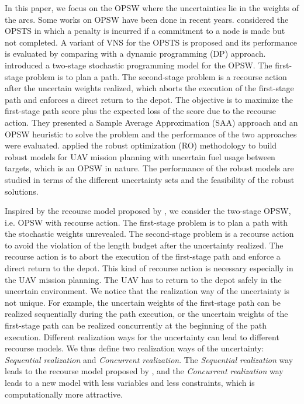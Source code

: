 \documentclass[preprint,review,10pt,round,authoryear]{elsarticle}\usepackage[]{graphicx}\usepackage[]{color}
\theoremstyle{plain}
\theoremstyle{definition}
\theoremstyle{remark}
\begin{document}
In this paper, we focus on the OPSW where the uncertainties lie in the weights of the arcs. Some works on OPSW have been done in recent years. \cite{campbell2011orienteering} considered the OPSTS in which a penalty is incurred if a commitment to a node is made but not completed. A variant of VNS for the OPSTS is proposed and its performance is evaluated by comparing with a dynamic programming (DP) approach. \cite{evers2014two} introduced a two-stage stochastic programming model for the OPSW. The first-stage problem is to plan a path. The second-stage problem is a recourse action after the uncertain weights realized, which aborts the execution of the first-stage path and enforces a direct return to the depot. The objective is to maximize the first-stage path score plus the expected loss of the score due to the recourse action. They presented a Sample Average Approximation (SAA) approach and an OPSW heuristic to solve the problem and the performance of the two approaches were evaluated. \cite{evers2014robust} applied the robust optimization (RO) methodology to build robust models for UAV mission planning with uncertain fuel usage between targets, which is an OPSW in nature. The performance of the robust models are studied in terms of the different uncertainty sets and the feasibility of the robust solutions. 


Inspired by the recourse model proposed by \cite{evers2014two}, we consider the two-stage OPSW, i.e. OPSW with recourse action. The first-stage problem is to plan a path with the stochastic weights unrevealed. The second-stage problem is a recourse action to avoid the violation of the length budget after the uncertainty realized. The recourse action is to abort the execution of the first-stage path and enforce a direct return to the depot. This kind of recourse action is necessary especially in the UAV mission planning. The UAV has to return to the depot safely in the uncertain environment. We notice that the realization way of the uncertainty is not unique. For example, the uncertain weights of the first-stage path can be realized sequentially during the path execution, or the uncertain weights of the first-stage path can be realized concurrently at the beginning of the path execution. Different realization ways for the uncertainty can lead to different recourse models. We thus define two realization ways of the uncertainty: \emph{Sequential realization} and \emph{Concurrent realization}. The \emph{Sequential realization} way leads to the recourse model proposed by \cite{evers2014two}, and the \emph{Concurrent realization} way leads to a new model with less variables and less constraints, which is computationally more attractive.
\end{document}
